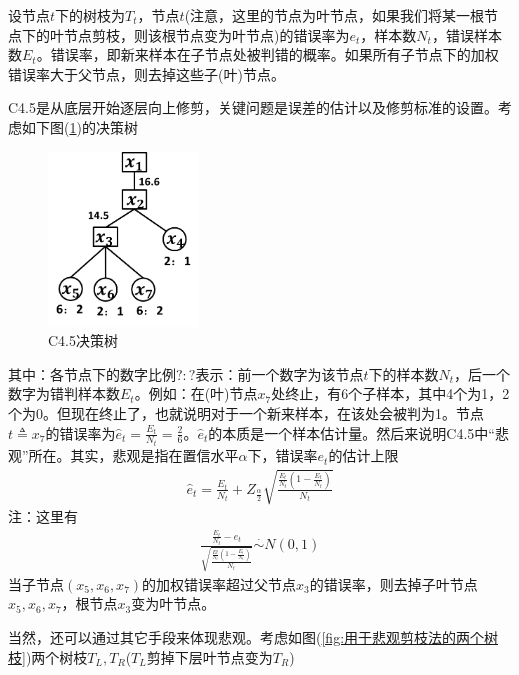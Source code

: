             设节点$t$下的树枝为$T_t$，节点$t$(注意，这里的节点为叶节点，如果我们将某一根节点下的叶节点剪枝，则该根节点变为叶节点)的错误率为$e_t$，样本数$N_t$，错误样本数$E_t$。错误率，即新来样本在子节点处被判错的概率。如果所有子节点下的加权错误率大于父节点，则去掉这些子(叶)节点。
            \par
            C4.5是从底层开始逐层向上修剪，关键问题是误差的估计以及修剪标准的设置。考虑如下图(\ref{fig:C4.5决策树})的决策树
                \begin{figure}[H]
                \centering
                \includegraphics[width=4cm]{images/C4.5.jpg}
                \caption{C4.5决策树}
                \label{fig:C4.5决策树}
                \end{figure}
            \noindent 其中：各节点下的数字比例$?:?$表示：前一个数字为该节点$t$下的样本数$N_t$，后一个数字为错判样本数$E_t$。例如：在(叶)节点$x_7$处终止，有6个子样本，其中4个为1，2个为0。但现在终止了，也就说明对于一个新来样本，在该处会被判为1。节点$t \triangleq x_7$的错误率为$\hat{e}_t= \frac{E_t}{N_t} = \frac{2}{6}$。$\hat{e}_t$的本质是一个样本估计量。然后来说明C4.5中“悲观”所在。其实，悲观是指在置信水平$\alpha$下，错误率$e_t$的估计上限
            \begin{align*}
            \hat{e}_t = \frac{E_t}{N_t}+Z_{\frac{\alpha}{2}}\sqrt{\frac{\frac{E_t}{N_t}(1-\frac{E_t}{N_t})}{N_t}}
            \end{align*}
            注：这里有
            \begin{align*}
            \frac{\frac{E_t}{N_t} - e_t}{\sqrt{\frac{\frac{Et}{N_t}(1-\frac{E_t}{N_t})}{N_t}}} \overset{\cdot}{\sim } N(0,1)
            \end{align*}
            当子节点$(x_5,x_6,x_7)$的加权错误率超过父节点$x_3$的错误率，则去掉子叶节点$x_5,x_6,x_7$，根节点$x_3$变为叶节点。
            \par
            当然，还可以通过其它手段来体现悲观。考虑如图(\ref{fig:用于悲观剪枝法的两个树枝})两个树枝$T_L,T_R$($T_L$剪掉下层叶节点变为$T_R$)
